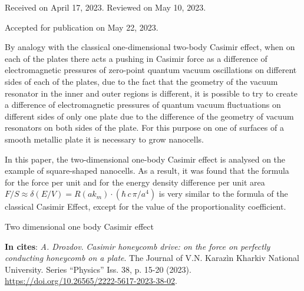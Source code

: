 \documentclass[twoside, 10pt]{article}
\def\myname{A. Drozdov}
\def\mytitle{Casimir honeycomb drive: on the force on perfectly conducting honeycomb on a plate}
\def\mydoi{10.26565/2222-5617-2023-38-02}
\def\envisnyk{The Journal of V.N. Karazìn Kharkiv National University. Series “Physics” Iss. 38, p. 15-20 (2023)}
\begin{document}
\vspace{3mm}
\centerline{Received on April 17, 2023. Reviewed on May 10, 2023.}
\centerline{Accepted for publication on May 22, 2023.}

\vspace{3.5mm}

By analogy with the classical one-dimensional two-body Casimir effect, when on each of the plates there acts a pushing in Casimir force as a difference of electromagnetic pressures of zero-point quantum vacuum oscillations on different sides of each of the plates, due to the fact that the geometry of the vacuum resonator in the inner and outer regions is different, it is possible to try to create a difference of electromagnetic pressures of quantum vacuum fluctuations on different sides of only one plate due to the difference of the geometry of vacuum resonators on both sides of the plate. For this purpose on one of surfaces of a smooth metallic plate it is necessary to grow nanocells.

In this paper, the two-dimensional one-body Casimir effect is analysed on the example of square-shaped nanocells. As a result, it was found that the formula for the force per unit and for the energy density difference per unit area $F/S \approx \delta\left(E/V\right) = R\left(a k_m\right)\cdot\left(\hbar\,c\,\pi/{a^4}\right)$ is very similar to the formula of the classical Casimir Effect, except for the value of the proportionality coefficient.


\begin{keywords}
Two dimensional one body Casimir effect
\end{keywords}

\vspace{5mm}

\noindent
\textbf{In cites}: \textit{\myname}. \textit{\mytitle}. {\envisnyk}. \href{https://doi.org/\mydoi}{https://doi.org/\mydoi}.
\end{document}
